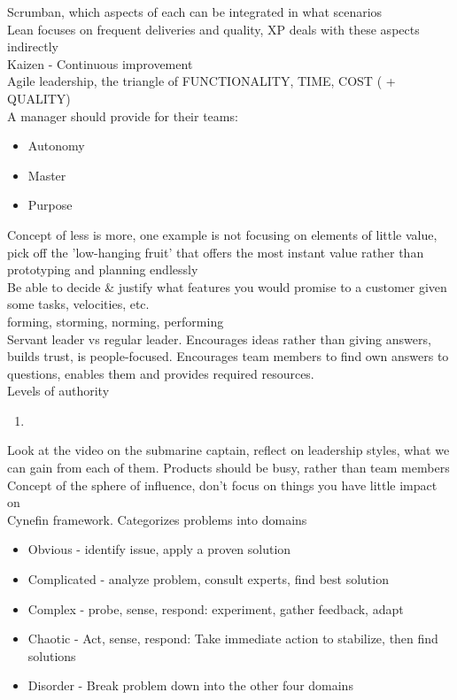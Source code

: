 \documentclass[10pt]{article}
\begin{document}
Scrumban, which aspects of each can be integrated in what scenarios\\
Lean focuses on frequent deliveries and quality, XP deals with these aspects indirectly\\
Kaizen - Continuous improvement\\
Agile leadership, the triangle of FUNCTIONALITY, TIME, COST ( + QUALITY)\\
A manager should provide for their teams:
\begin{itemize}
\item Autonomy
\item Master
\item Purpose
\end{itemize}
Concept of less is more, one example is not focusing on elements of little value, pick off the 'low-hanging fruit' that offers the most instant value rather than prototyping and planning endlessly\\
Be able to decide \& justify what features you would promise to a customer given some tasks, velocities, etc.\\
forming, storming, norming, performing\\
Servant leader vs regular leader. Encourages ideas rather than giving answers, builds trust, is people-focused. Encourages team members to find own answers to questions, enables them and provides required resources.\\
Levels of authority
\begin{enumerate}
\item 
\end{enumerate}
Look at the video on the submarine captain, reflect on leadership styles, what we can gain from each of them. Products should be busy, rather than team members \\
Concept of the sphere of influence, don't focus on things you have little impact on\\
Cynefin framework. Categorizes problems into domains
\begin{itemize}
\item Obvious - identify issue, apply a proven solution
\item Complicated - analyze problem, consult experts, find best solution
\item Complex - probe, sense, respond: experiment, gather feedback, adapt
\item Chaotic - Act, sense, respond: Take immediate action to stabilize, then find solutions
\item Disorder - Break problem down into the other four domains
\end{itemize}
\end{document}
